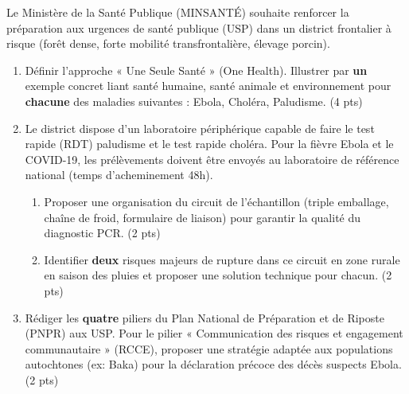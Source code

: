 \documentclass[11pt]{article}
\begin{document}
\begin{exercice}
Le Ministère de la Santé Publique (MINSANTÉ) souhaite renforcer la préparation aux urgences de santé publique (USP) dans un district frontalier à risque (forêt dense, forte mobilité transfrontalière, élevage porcin).
\begin{enumerate}
    \item Définir l'approche « Une Seule Santé » (One Health). Illustrer par \textbf{un} exemple concret liant santé humaine, santé animale et environnement pour \textbf{chacune} des maladies suivantes : Ebola, Choléra, Paludisme. (4 pts)
    \item Le district dispose d'un laboratoire périphérique capable de faire le test rapide (RDT) paludisme et le test rapide choléra. Pour la fièvre Ebola et le COVID-19, les prélèvements doivent être envoyés au laboratoire de référence national (temps d'acheminement \num{48}h). 
    \begin{enumerate}
        \item Proposer une organisation du circuit de l'échantillon (triple emballage, chaîne de froid, formulaire de liaison) pour garantir la qualité du diagnostic PCR. (2 pts)
        \item Identifier \textbf{deux} risques majeurs de rupture dans ce circuit en zone rurale en saison des pluies et proposer une solution technique pour chacun. (2 pts)
    \end{enumerate}
    \item Rédiger les \textbf{quatre} piliers du Plan National de Préparation et de Riposte (PNPR) aux USP. Pour le pilier « Communication des risques et engagement communautaire » (RCCE), proposer une stratégie adaptée aux populations autochtones (ex: Baka) pour la déclaration précoce des décès suspects Ebola. (2 pts)
\end{enumerate}
\end{exercice}
\end{document}
